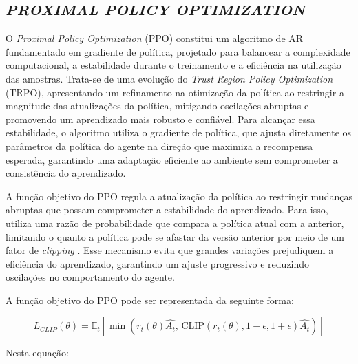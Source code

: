 \documentclass[
    12pt,                %
    openright,           %
    oneside,             %
    a4paper,             %
    english,             %
    spanish,             %
    brazil               %
]{ufscar}
\begin{document}
\subsection{\textit{PROXIMAL POLICY OPTIMIZATION}}

O \textit{Proximal Policy Optimization} (PPO) \cite{schulman_proximal_2017} constitui um algoritmo de AR fundamentado em gradiente de política, projetado para balancear a complexidade computacional, a estabilidade durante o treinamento e a eficiência na utilização das amostras. Trata-se de uma evolução do \textit{Trust Region Policy Optimization} (TRPO), apresentando um refinamento na otimização da política ao restringir a magnitude das atualizações da política, mitigando oscilações abruptas e promovendo um aprendizado mais robusto e confiável. Para alcançar essa estabilidade, o algoritmo utiliza o gradiente de política, que ajusta diretamente os parâmetros da política do agente na direção que maximiza a recompensa esperada, garantindo uma adaptação eficiente ao ambiente sem comprometer a consistência do aprendizado.

A função objetivo do PPO regula a atualização da política ao restringir mudanças abruptas que possam comprometer a estabilidade do aprendizado. Para isso, utiliza uma razão de probabilidade que compara a política atual com a anterior, limitando o quanto a política pode se afastar da versão anterior por meio de um fator de \textit{clipping} \cite{schulman_proximal_2017}. Esse mecanismo evita que grandes variações prejudiquem a eficiência do aprendizado, garantindo um ajuste progressivo e reduzindo oscilações no comportamento do agente.

A função objetivo do PPO pode ser representada da seguinte forma:

\begin{equation}
L_{CLIP}\left(\theta\right) = \mathbb{E}_t \left[ \min \left( r_t\left(\theta\right)\widehat{A_t}, \, \text{CLIP}\left(r_t\left(\theta\right), 1 - \epsilon, 1 + \epsilon\right)\widehat{A_t} \right) \right]
\end{equation}

Nesta equação:
\end{document}
